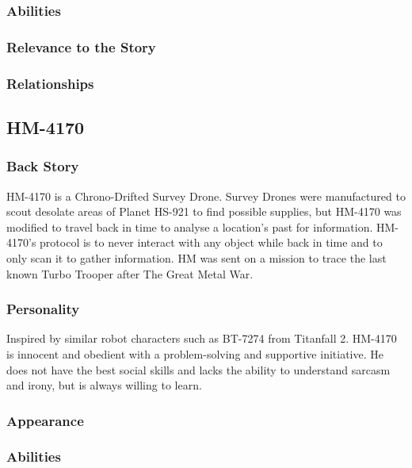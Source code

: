 \documentclass[12pt]{article}
\begin{document}
\subsubsection{Abilities}

\subsubsection{Relevance to the Story}

\subsubsection{Relationships}

\subsection{HM-4170}

\subsubsection{Back Story}

HM-4170 is a Chrono-Drifted Survey Drone. Survey Drones were manufactured to scout desolate areas of Planet HS-921 to find possible supplies, but HM-4170 was modified to travel back in time to analyse a location's past for information. HM-4170's protocol is to never interact with any object while back in time and to only scan it to gather information. HM was sent on a mission to trace the last known Turbo Trooper after The Great Metal War. 

\subsubsection{Personality}

Inspired by similar robot characters such as BT-7274 from Titanfall 2. HM-4170 is innocent and obedient with a problem-solving and supportive initiative. He does not have the best social skills and lacks the ability to understand sarcasm and irony, but is always willing to learn.

\subsubsection{Appearance}

\subsubsection{Abilities}
\end{document}
